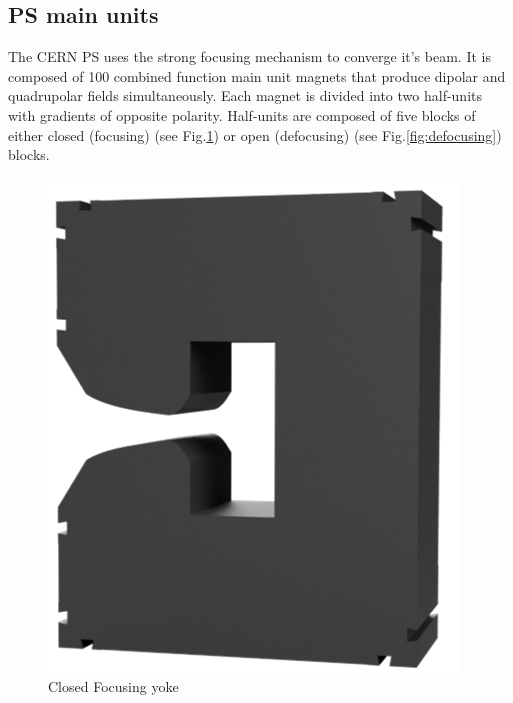 \documentclass[a4paper,
               biblatex,     %
               keeplastbox,   %
               ]{jacow}
\begin{document}
\subsection{PS main units}
The CERN PS uses the strong focusing mechanism to converge it's beam. It is composed of 100 combined function main unit magnets that produce dipolar and quadrupolar fields simultaneously. Each magnet is divided into two half-units with gradients of opposite polarity. Half-units are composed of five blocks of either closed (focusing) (see Fig.\ref{fig:focusing}) or open (defocusing) (see Fig.\ref{fig:defocusing}) blocks.

\begin{figure}[!htb]
  \centering
  \begin{minipage}[b]{0.45\columnwidth}
    \includegraphics*[width=\textwidth]{focusing}
    \caption{Closed Focusing yoke}
    \label{fig:focusing}
  \end{minipage}
  \hfill
  \begin{minipage}[b]{0.45\columnwidth}

\end{minipage}
\end{figure}
\end{document}
